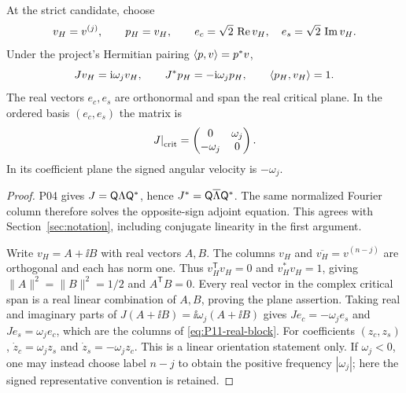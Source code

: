 \begin{proposition}
\label{prop:P11-vectors}
At the strict candidate, choose
\begin{equation}
 v_H=v^{(j)},\qquad p_H=v_H,\qquad
 e_c=\sqrt2\,\operatorname{Re} v_H,\quad e_s=\sqrt2\,\operatorname{Im} v_H.
 \label{eq:P11-vectors}
\end{equation}
Under the project's Hermitian pairing $\langle p,v\rangle=p^*v$,
\begin{equation}
 Jv_H=\mathrm{i}\omega_jv_H,\qquad
 J^*p_H=-\mathrm{i}\omega_jp_H,\qquad \langle p_H,v_H\rangle=1.
 \label{eq:P11-adjoint}
\end{equation}
The real vectors $e_c,e_s$ are orthonormal and span the real critical
plane. In the ordered basis $(e_c,e_s)$ the matrix is
\begin{equation}
 \left.J\right|_{\rm crit}=
 \begin{pmatrix}0&\omega_j\\-\omega_j&0\end{pmatrix}.
 \label{eq:P11-real-block}
\end{equation}
In its coefficient plane the signed angular velocity is $-\omega_j$.
\end{proposition}
\begin{proof}
P04 gives $J=\mathsf{Q}\Lambda\mathsf{Q}^*$, hence
$J^*=\mathsf{Q}\overline\Lambda\mathsf{Q}^*$. The same normalized
Fourier column therefore solves the opposite-sign adjoint equation.
This agrees with Section~\ref{sec:notation}, including conjugate
linearity in the first argument.

Write $v_H=A+\ii B$ with real vectors $A,B$.
The columns $v_H$ and $\overline{v_H}=v^{(n-j)}$ are orthogonal
and each has norm one. Thus $v_H^{\mathsf T}v_H=0$ and
$v_H^*v_H=1$, giving
$\|A\|^2=\|B\|^2=1/2$ and $A^{\mathsf T}B=0$.
Every real vector in the complex critical span is a real linear
combination of $A,B$, proving the plane assertion. Taking real and
imaginary parts of $J(A+\ii B)=\ii\omega_j(A+\ii B)$ gives
$Je_c=-\omega_j e_s$ and $Je_s=\omega_j e_c$, which are the
columns of \eqref{eq:P11-real-block}. For coefficients $(z_c,z_s)$,
$\dot z_c=\omega_jz_s$ and $\dot z_s=-\omega_jz_c$.
This is a linear orientation statement only. If $\omega_j<0$, one
may instead choose label $n-j$ to obtain the positive frequency
$|\omega_j|$; here the signed representative convention is retained.
\end{proof}

